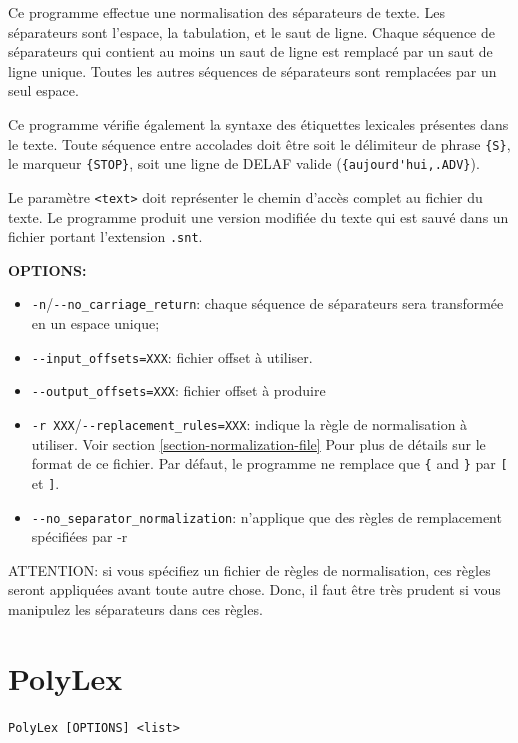 \bigskip
\noindent {} 
Ce programme effectue une normalisation des séparateurs de texte. Les séparateurs sont l'espace, la
tabulation, et le saut de ligne. Chaque séquence de séparateurs qui contient au moins un saut de
ligne est remplacé par un saut de ligne unique. Toutes les autres séquences de séparateurs sont
remplacées par un seul espace.

\bigskip
\noindent Ce programme vérifie également la syntaxe des étiquettes lexicales présentes dans le
texte. Toute séquence entre accolades doit être soit le délimiteur de phrase \verb+{S}+,
le marqueur \verb+{STOP}+, soit une ligne de DELAF valide (\verb+{aujourd'hui,.ADV}+). 

\bigskip
\noindent {} Le paramètre \verb+<text>+ doit représenter le chemin d’accès complet au fichier du texte. Le programme produit une version modifiée du texte qui est sauvé dans
un fichier portant l’extension \verb+.snt+.

\bigskip
\noindent \textbf{OPTIONS:}
\begin{itemize}
\item \verb+-n+/\verb+--no_carriage_return+: chaque séquence de séparateurs sera transformée en un
	espace unique;
\item \verb+--input_offsets=XXX+: fichier offset à utiliser.
\item \verb+--output_offsets=XXX+: fichier offset à  produire
\item \verb+-r XXX+/\verb+--replacement_rules=XXX+: indique la règle de normalisation à utiliser.
	Voir section \ref{section-normalization-file} Pour plus de détails sur le format de
	ce fichier. Par défaut, le programme ne remplace que \verb+{+ and \verb+}+ par \verb+[+ et
	\verb+]+.
\item \verb+--no_separator_normalization+: n'applique que des règles de remplacement  spécifiées par
	-r
\end{itemize}

\bigskip
\noindent ATTENTION: si vous spécifiez un fichier de règles de normalisation, ces règles seront
appliquées avant toute autre chose. Donc, il faut être très prudent si vous manipulez les
séparateurs dans ces règles.






\section{PolyLex}
\verb+PolyLex [OPTIONS] <list>+

